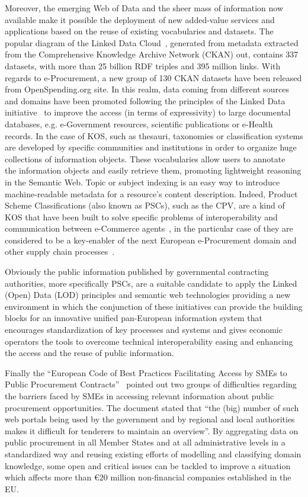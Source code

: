 Moreover, the emerging Web of Data and the sheer mass of information now available make it possible the deployment of new 
added-value services and applications based on the reuse of existing vocabularies and datasets. 
The popular diagram of the Linked Data Cloud~\cite{linked-data-cloud}, generated from metadata extracted from the 
Comprehensive Knowledge Archive Network (CKAN) out, contains 337 datasets, with more than 25 billion RDF triples and 395 million links. 
With regards to e-Procurement, a new group of 130 CKAN datasets have been released from OpenSpending.org site. In this realm, 
data coming from different sources and domains have been promoted following the principles of the 
Linked Data initiative~\cite{Berners-Lee-2006} to improve the access (in terms of expressivity) to large documental databases, 
e.g. e-Government resources, scientific publications or e-Health records. In the case of KOS, such as thesauri, taxonomies or classification systems 
are developed by specific communities and institutions in order to organize huge collections of information objects. 
These vocabularies allow users to annotate~\cite{Leukel-standard,Leukel-automating,Leukel-comparative} the information objects and easily retrieve them, 
promoting lightweight reasoning in the Semantic Web. Topic or subject indexing is an easy way to introduce machine-readable metadata for a resource's content 
description. Indeed, Product Scheme Classifications (also known as PSCs), such as the CPV, are a kind of KOS that have been built to solve specific problems 
of interoperability and communication between e-Commerce agents~\cite{FenselOmel2001,Leukel-findings}, in the particular case of they are considered to be a key-enabler of 
the next European e-Procurement domain and other supply chain processes~\cite{DBLP:journals/tcci/Alor-HernandezAJPRMBG10}. 

Obviously the public information published by governmental contracting authorities, more specifically PSCs, are a suitable candidate to apply the Linked (Open) Data 
(LOD) principles and semantic web technologies providing a new environment in which the conjunction of these initiatives can provide the building blocks for an 
innovative unified pan-European information system that encourages standardization of key processes and systems and gives economic operators the tools to overcome 
technical interoperability easing and enhancing the access and the reuse of public information.

Finally the ``European Code of Best Practices Facilitating Access by SMEs to Public Procurement Contracts''~\cite{d2008} pointed out 
two groups of difficulties regarding the barriers faced by SMEs in accessing relevant information about public procurement opportunities. 
The document stated that ``the (big) number of such web portals being used by the government and by regional and local authorities makes it difficult 
for tenderers to maintain an overview''. By aggregating data on public procurement in all Member States 
and at all administrative levels in a standardized way and reusing existing efforts of modelling 
and classifying domain knowledge, some open and critical issues can be tackled to improve a situation which affects more 
than \euro $20$ million non-financial companies established in the EU.


